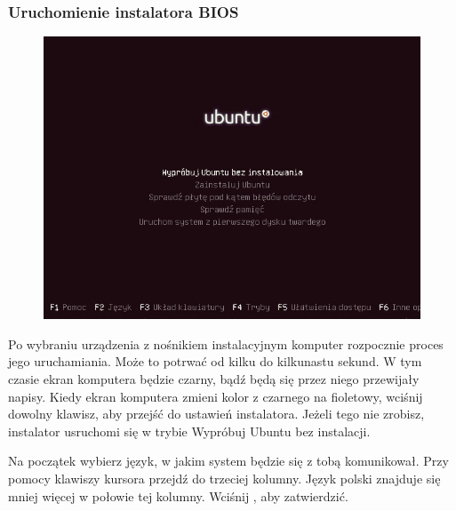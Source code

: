 \subsubsection{Uruchomienie instalatora BIOS}
\label{instalacja_uruchomienie}
\begin{figure}
                \includegraphics[width=\linewidth]{images/instalacja_BIOS_boot.png}
\end{figure}

Po wybraniu urządzenia z nośnikiem instalacyjnym komputer rozpocznie proces jego uruchamiania. Może to potrwać od kilku do kilkunastu sekund. W tym czasie ekran komputera będzie czarny, bądź będą się przez niego przewijały napisy. Kiedy ekran komputera zmieni kolor z czarnego na fioletowy, wciśnij dowolny klawisz, aby przejść do ustawień instalatora. Jeżeli tego nie zrobisz, instalator usruchomi się w trybie \textcolor{ubuntu_orange}{Wypróbuj Ubuntu bez instalacji}.

Na początek wybierz język, w jakim system będzie się z tobą komunikował. Przy pomocy klawiszy kursora przejdź do trzeciej kolumny. Język polski znajduje się mniej więcej w połowie tej kolumny. Wciśnij , aby zatwierdzić.


